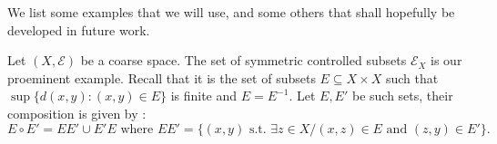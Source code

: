 

We list some examples that we will use, and some others that shall hopefully be developed in future work.

\begin{Expl}
Let $(X,\mathcal E)$ be a coarse space. The set of symmetric controlled subsets $\mathcal E_X$ is our proeminent example. Recall that it is the set of subsets $E\subseteq X\times X$ such that $\sup \{ d(x,y) : (x,y)\in E\}$ is finite and $E=E^{-1}$. Let $E,E'$ be such sets, their composition is given by :
\[E\circ E' = EE' \cup E'E \text{ where }EE' = \{(x,y) \text{ s.t. }\exists z\in X / (x,z)\in E \text{ and }(z,y)\in E'\}.\]
\end{Expl}

